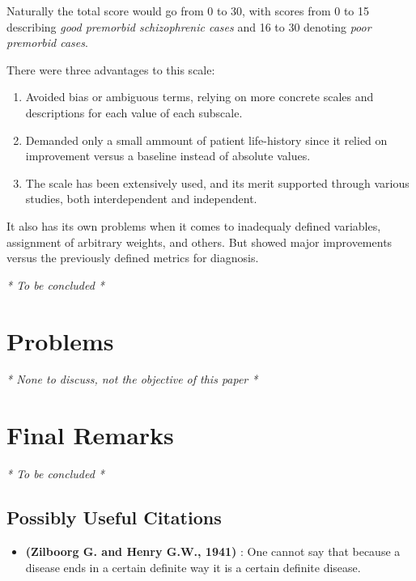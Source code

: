 \documentclass{Paper_Summary}
\begin{document}
    Naturally the total score would go from 0 to 30, with scores from 0 to 15 describing \emph{good premorbid schizophrenic cases} and 16 to 30 denoting \emph{poor premorbid cases}.

    There were three advantages to this scale:
    \begin{enumerate}
        \item Avoided bias or ambiguous terms, relying on more concrete scales and descriptions for each value of each subscale.
        \item Demanded only a small ammount of patient life-history since it relied on improvement versus a baseline instead of absolute values.
        \item The scale has been extensively used, and its merit supported through various studies, both interdependent and independent.
    \end{enumerate}

    It also has its own problems when it comes to inadequaly defined variables, assignment of arbitrary weights, and others. But showed major improvements versus the previously defined metrics for diagnosis.

\emph{* To be concluded *}

\section{Problems}
\emph{* None to discuss, not the objective of this paper *}


\section{Final Remarks}
\emph{* To be concluded *}

\breakline

\begin{center}
    \section*{Possibly Useful Citations}
\end{center}

    \begin{itemize}
        \item \textbf{(Zilboorg  G.  and   Henry G.W., 1941)} : One cannot say that because a disease ends in a certain definite way it is a certain definite disease.
    \end{itemize}
\end{document}
